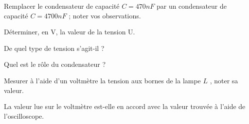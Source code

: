 \documentclass[11pt,a4paper]{article}
\begin{document}
Remplacer le condensateur de capacité $C=470 nF$ par un condensateur de capacité $C= 4 700 nF$ ; noter vos observations. 
\vfill 
\dotfill


Déterminer, en V, la valeur de la tension U.
\vfill 
\dotfill 

De quel type de tension s'agit-il ? 
\vfill
\dotfill 

Quel est le rôle du condensateur ? 
\vfill 
\dotfill 

\vfill 
Mesurer à l'aide d'un voltmètre la tension aux bornes de la lampe $L$ , noter sa valeur. \dotfill 

La valeur lue sur le voltmètre est-elle en accord avec la valeur trouvée à l'aide de l'oscilloscope. 
\vfill 

\dotfill 




\vfill 
\end{document}
